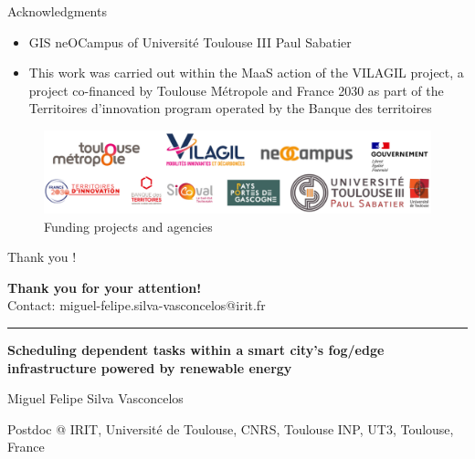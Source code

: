 \documentclass[Ligatures=TeX,table,svgnames,usetotalslideindicator,compress,10pt,aspectratio=169]{beamer}
\begin{document}
\begin{frame}{Acknowledgments}
  \begin{itemize}
  \small
   \item  GIS neOCampus of Université Toulouse III Paul Sabatier
   \item This work was carried out within the MaaS action of the VILAGIL project, a project co-financed by Toulouse Métropole and France 2030 as part of the Territoires d'innovation program operated by the Banque des territoires
  \end{itemize}    
    \begin{center}
    \begin{figure}[h]    
      \centering
      \includegraphics[width=\textwidth]{images/ack4.png}
      \caption{Funding projects and agencies}
    \end{figure}    
  \end{center}  

\end{frame}



\begin{frame}{Thank you !}


\textbf{Thank you for your attention!}\\
Contact: miguel-felipe.silva-vasconcelos@irit.fr

\par\noindent\rule{\textwidth}{0.5pt}

\begin{center}

\textbf{Scheduling dependent tasks within a smart city's fog/edge infrastructure powered by renewable energy}

Miguel Felipe Silva Vasconcelos

Postdoc @ IRIT, Université de Toulouse, CNRS, Toulouse INP, UT3, Toulouse, France \\
\end{center}

\end{frame}
\end{document}
